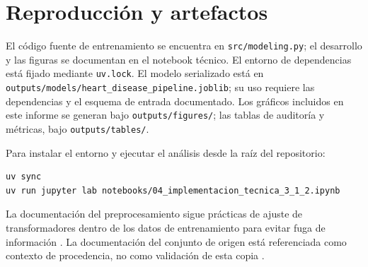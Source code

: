 \documentclass[12pt,a4paper]{article}
\begin{document}
\section{Reproducción y artefactos}
El código fuente de entrenamiento se encuentra en \texttt{src/modeling.py}; el desarrollo y las figuras se documentan en el notebook técnico. El entorno de dependencias está fijado mediante \texttt{uv.lock}. El modelo serializado está en \texttt{outputs/models/heart\_disease\_pipeline.joblib}; su uso requiere las dependencias y el esquema de entrada documentado. Los gráficos incluidos en este informe se generan bajo \texttt{outputs/figures/}; las tablas de auditoría y métricas, bajo \texttt{outputs/tables/}.

Para instalar el entorno y ejecutar el análisis desde la raíz del repositorio:
\begin{lstlisting}[language=bash]
uv sync
uv run jupyter lab notebooks/04_implementacion_tecnica_3_1_2.ipynb
\end{lstlisting}

La documentación del preprocesamiento sigue prácticas de ajuste de transformadores dentro de los datos de entrenamiento para evitar fuga de información \parencite{scikit-learn-common-pitfalls}. La documentación del conjunto de origen está referenciada como contexto de procedencia, no como validación de esta copia \parencite{uci-heart-disease,kaggle-heart}.

\printbibliography
\end{document}
